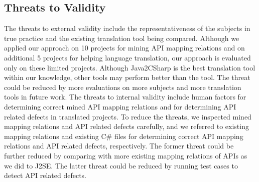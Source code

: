 \subsection{Threats to Validity}
\label{sec:evaluation:threats} The threats to external validity
include the representativeness of the subjects in true practice and
the existing translation tool being compared. Although we applied
our approach on 10 projects for mining API mapping relations and on additional
5 projects for helping language translation, our approach is
evaluated only on these limited projects. Although Java2CSharp is
the best translation tool within our knowledge, other tools may perform
better than the tool. The threat could be reduced by more
evaluations on more subjects and more translation tools in future
work. The threats to internal validity include human factors for
determining correct mined API mapping relations and for determining API related defects in
translated projects. To reduce the threats, we inspected mined
mapping relations and API related defects carefully, and we referred to existing
mapping relations and existing C\# files for determining correct API
mapping relations and API related defects, respectively. The former threat could be further
reduced by comparing with more existing mapping relations of APIs as we did to
J2SE. The latter threat could be reduced by running test cases to detect API related defects.

